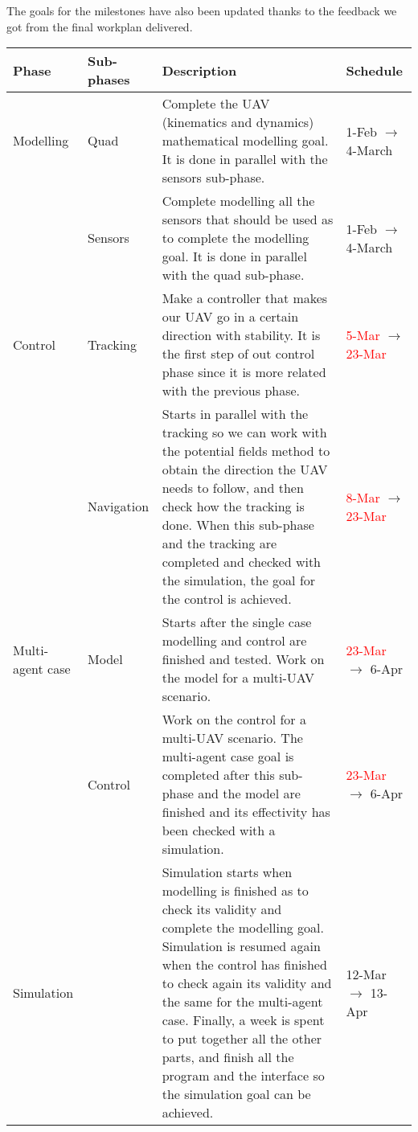 \documentclass{article}
\begin{document}
The goals for the milestones have also been updated thanks to the feedback we got from the final workplan delivered.
	\begin{center}
	\begin{tabular}[H]{|C{2cm}|C{2cm}|C{7cm}|C{3cm}|} \hline
		Phase & Sub-phases & Description & Schedule\\ \hline
		Modelling & Quad & Complete the UAV (kinematics and dynamics) mathematical modelling goal. It is done in parallel with the sensors sub-phase. &  1-Feb $\rightarrow$ 4-March  \\ 
		& Sensors & Complete modelling all the sensors that should be used as to complete the modelling goal. It is done in parallel with the quad sub-phase. & 1-Feb $\rightarrow$ 4-March \\ \hline
		
		Control & Tracking & Make a controller that makes our UAV go in a certain direction with stability. It is the first step of out control phase since it is more related with the previous phase. &  \textcolor{red}{5-Mar} $\rightarrow$ \textcolor{red}{23-Mar}\\ 
		&Navigation & Starts in parallel with the tracking so we can work with the potential fields method to obtain the direction the UAV needs to follow, and then check how the tracking is done. When this sub-phase and the tracking are completed and checked with the simulation, the goal for the control is achieved. & \textcolor{red}{8-Mar} $\rightarrow$ \textcolor{red}{23-Mar} \\ \hline
		
		Multi-agent case & Model & Starts after the single case modelling and control are finished and tested. Work on the model for a multi-UAV scenario. & \textcolor{red}{23-Mar} $\rightarrow$ 6-Apr\\ 
		&Control & Work on the control for a multi-UAV scenario. The multi-agent case goal is completed after this sub-phase and the model are finished and its effectivity has been checked with a simulation. & \textcolor{red}{23-Mar} $\rightarrow$ 6-Apr \\ \hline
		
		Simulation & & Simulation starts when modelling is finished as to check its validity and complete the modelling goal. Simulation is resumed again when the control has finished to check again its validity and the same for the multi-agent case. Finally, a week is spent to put together all the other parts, and finish all the program and the interface so the simulation goal can be achieved. & 12-Mar $\rightarrow$ 13-Apr \\ \hline
		

\end{tabular}
\end{center}
\end{document}
